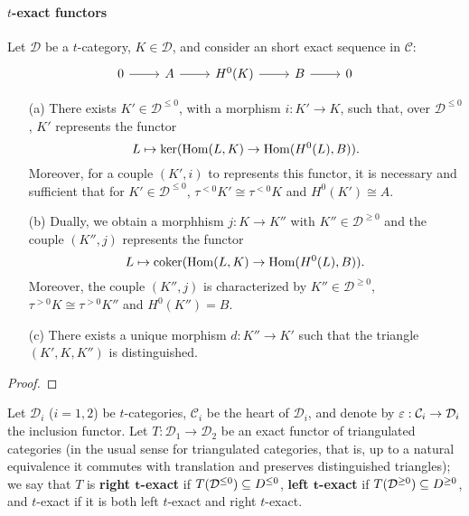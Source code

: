 \paragraph{\texorpdfstring{$t$}{t}-exact functors}
\begin{proposition}\label{triangle cat t-structure truncation <0 and leq 0}
Let $\mathcal{D}$ be a $t$-category, $K\in\mathcal{D}$, and consider an short exact sequence in $\mathcal{C}$:
\[\begin{tikzcd}
0\ar[r]&A\ar[r]&H^0(K)\ar[r]&B\ar[r]&0
\end{tikzcd}\]
\begin{enumerate}
    \item[(a)] There exists $K'\in\mathcal{D}^{\leq 0}$, with a morphism $i:K'\to K$, such that, over $\mathcal{D}^{\leq 0}$, $K'$ represents the functor
    \[L\mapsto\operatorname{ker}(\mathrm{Hom}(L,K)\to\mathrm{Hom}(H^0(L),B)).\]
    Moreover, for a couple $(K',i)$ to represents this functor, it is necessary and sufficient that for $K'\in\mathcal{D}^{\leq 0}$, $\tau^{<0}K'\cong\tau^{<0}K$ and $H^0(K')\cong A$.
    \item[(b)] Dually, we obtain a morphhism $j:K\to K''$ with $K''\in\mathcal{D}^{\geq 0}$ and the couple $(K'',j)$ represents the functor 
    \[L\mapsto\operatorname{coker}(\mathrm{Hom}(L,K)\to\mathrm{Hom}(H^0(L),B)).\]
    Moreover, the couple $(K'',j)$ is characterized by $K''\in\mathcal{D}^{\geq 0}$, $\tau^{>0}K\cong\tau^{>0}K''$ and $H^0(K'')=B$.
    \item[(c)] There exists a unique morphism $d:K''\to K'$ such that the triangle $(K',K,K'')$ is distinguished.
\end{enumerate}
\end{proposition}
\begin{proof}

\end{proof}

Let $\mathcal{D}_i$ ($i=1,2$) be $t$-categories, $\mathcal{C}_i$ be the heart of $\mathcal{D}_i$, and denote by $\varepsilon:\mathcal{C}_i\to\mathcal{D}_i$ the inclusion functor. Let $T:\mathcal{D}_1\to\mathcal{D}_2$ be an exact functor of triangulated categories (in the usual sense for triangulated categories, that is, up to a natural equivalence it commutes with translation and preserves distinguished triangles); we say that $T$ is \textbf{right $\bm{t}$-exact} if $T(\mathcal{D}^{\leq 0})\subseteq D^{\leq 0}$, \textbf{left $\bm{t}$-exact} if $T(\mathcal{D}^{\geq 0})\subseteq D^{\geq 0}$, and $t$-exact if it is both left $t$-exact and right $t$-exact.

